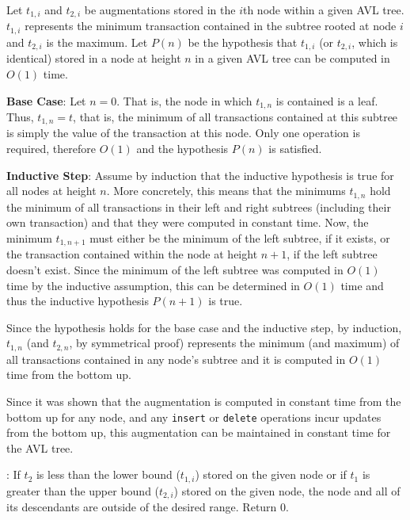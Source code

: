 \documentclass[12pt,twoside]{article}
\begin{document}
\begin{problems}
\begin{problemparts}
\problempart Let $ t_{1,i} $ and $ t_{2,i} $ be augmentations stored in the
    $i$th node within a given AVL tree. $ t_{1,i} $ represents the minimum
    transaction contained in the subtree rooted at node $i$ and $ t_{2,i} $
    is the maximum. Let $ P(n) $ be the hypothesis that $ t_{1,i} $ (or $
    t_{2,i} $, which is identical) stored in a node at height $ n $ in a
    given AVL tree can be computed in $ O(1) $ time.

    {\bf Base Case}: Let $ n = 0 $. That is, the node in which $ t_{1, n} $
    is contained is a leaf. Thus, $ t_{1, n} = t $, that is, the minimum of
    all transactions contained at this subtree is simply the value of the
    transaction at this node. Only one operation is required, therefore $
    O(1) $ and the hypothesis $ P(n) $ is satisfied.

    {\bf Inductive Step}: Assume by induction that the inductive hypothesis
    is true for all nodes at height $ n $. More concretely, this means that
    the minimums $ t_{1, n} $ hold the minimum of all transactions in their
    left and right subtrees (including their own transaction) and that they
    were computed in constant time. Now, the minimum $ t_{1,n+1} $ must
    either be the minimum of the left subtree, if it exists, or the
    transaction contained within the node at height $n + 1$, if the left
    subtree doesn't exist. Since the minimum of the left subtree was computed
    in $ O(1) $ time by the inductive assumption, this can be determined in $
    O(1) $ time and thus the inductive hypothesis $ P(n + 1) $ is true.

    Since the hypothesis holds for the base case and the inductive step, by
    induction, $ t_{1, n} $ (and $ t_{2,n} $, by symmetrical proof)
    represents the minimum (and maximum) of all transactions contained in any
    node's subtree and it is computed in $ O(1) $ time from the bottom up.

    \smallbreak
    
    Since it was shown that the augmentation is computed in constant time
    from the bottom up for any node, and any {\tt insert} or {\tt delete}
    operations incur updates from the bottom up, this augmentation can be
    maintained in constant time for the AVL tree.

: If $ t_2 $ is less than the lower bound ($
    t_{1,i} $) stored on the given node or if $ t_1 $ is greater than the
    upper bound ($ t_{2,i} $) stored on the given node, the node and all
    of its descendants are outside of the desired range. Return 0.


\end{problemparts}
\end{problems}
\end{document}
